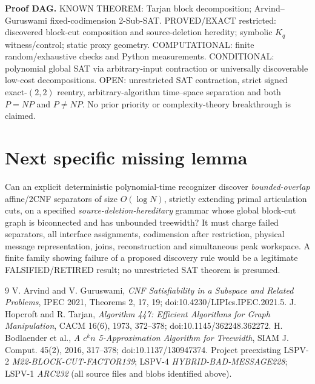 \documentclass[10pt]{article}
\begin{document}
\noindent\textbf{Proof DAG.} KNOWN THEOREM: Tarjan block decomposition; Arvind--Guruswami fixed-codimension 2-Sub-SAT. PROVED/EXACT restricted: discovered block-cut composition and source-deletion heredity; symbolic $K_q$ witness/control; static proxy geometry. COMPUTATIONAL: finite random/exhaustive checks and Python measurements. CONDITIONAL: polynomial global SAT via arbitrary-input contraction or universally discoverable low-cost decompositions. OPEN: unrestricted SAT contraction, strict signed exact-$(2,2)$ reentry, arbitrary-algorithm time--space separation and both $P=NP$ and $P\ne NP$. No prior priority or complexity-theory breakthrough is claimed.

\section{Next specific missing lemma}
Can an explicit deterministic polynomial-time recognizer discover \emph{bounded-overlap} affine/2CNF separators of size $O(\log N)$, strictly extending primal articulation cuts, on a specified \emph{source-deletion-hereditary} grammar whose global block-cut graph is biconnected and has unbounded treewidth? It must charge failed separators, all interface assignments, codimension after restriction, physical message representation, joins, reconstruction and simultaneous peak workspace. A finite family showing failure of a proposed discovery rule would be a legitimate FALSIFIED/RETIRED result; no unrestricted SAT theorem is presumed.

\begin{thebibliography}{9}
 V. Arvind and V. Guruswami, \emph{CNF Satisfiability in a Subspace and Related Problems}, IPEC 2021, Theorems 2, 17, 19; doi:10.4230/LIPIcs.IPEC.2021.5.
 J. Hopcroft and R. Tarjan, \emph{Algorithm 447: Efficient Algorithms for Graph Manipulation}, CACM 16(6), 1973, 372--378; doi:10.1145/362248.362272.
 H. Bodlaender et al., \emph{A $c^k n$ 5-Approximation Algorithm for Treewidth}, SIAM J. Comput. 45(2), 2016, 317--378; doi:10.1137/130947374.
 Project preexisting LSPV-2 \emph{M22-BLOCK-CUT-FACTOR139}; LSPV-4 \emph{HYBRID-BAD-MESSAGE228}; LSPV-1 \emph{ARC232} (all source files and blobs identified above).
\end{thebibliography}
\end{document}
